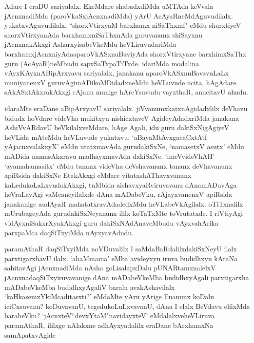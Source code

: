 \begin{artha}
Adare I eraDU sariyalalx. EkeMdare shabadxdiMda uMTAda keVvala jAcnxnadiMda (paroVkaSxjAcnxnadiMda) yArU AcAyaR\-\break neMdAguvudilalx. yukatxvAguvudilalx, ``shorxVtirxyaM barxhamx niSaThxmf" eMdu shurxtiyeV shorxVtirxyanAda barxhamxniSaThxnAda guruvanunx shiSayxnu jAcnxnakAkxgi AsharxyisabeVkeMdu heVLiruvudariMda barxhamxjAcnxniyAda\break aparoVkASxnuBaviyAda shorxVtirxyane barxhimxSaThx guru (AcAyaR)\break neMbudu sapxSaTxpaTiTxde. idariMda modalina vAyxKAyxnABipArxyavu sariyalalx, janakanu aparoVkASxnuBavavuLaLx muniyanenxV guruvAgimADikoMDidadxneMdu heVLuvude ucita, hAgAdare sAkASxtAkxrakAkxgi rAjanu munige hAreYsuvudu vayxthaR, anucitavU ahudu. 
\end{artha}
\newpage
\begin{artha}
idaraMte eraDane aBipArxyavU sariyalalx. jiVvanumxkatxnAgidadxlilx deVhavu bidudx hoVdare videVha mukitxyu nishicxtaveV AgideyAdadx\-riMda janakana AshiVvARdavU beVkilalxveMdare, hAge Agali, idu guru dakiSxNigAgiyeV heVLida mAteMdu heVLuvude yukatxvu, `aBayaMtAvxgacaCxtAtf yAjacnxvalakxyX' eMdu utatxmavAda gurudakiSxNe, `namasetxV asutx' eMdu mADida namasAkxravu madhayxmavAda dakiSxNe. `imeVvideVhAH' `ayamahamasitx' eMdu tananx videVha deVshavanunx tananx deVhavanunx apiRsida dakiSxNe EtakAkxgi eMdare vitatxshAThayxvanunx kaLedukoLaLxvudakAkxgi, tuMbida aishavxyaRviruvavanu dAnamADuvAga heVraLavAgi vaMcaneyilalxde dAna mADabeVku, rAjayxvanenxV apiRsida janakanige audAyaR mahatatxravAdadedxMdu heVLabeVkAgilalx. oTiTxnalilx mUrubageyAda gurudakiSxNeyanunx ililx koTaTxMte toVrutatxde. I riVtiyAgi vidAyxniSakxrXyakAkxgi guru dakiSxNAdAnaveMbudu vAyxvahArika parxpaMca daqSiTxyiMda nAyxyavAdudu. 
\end{artha}


\begin{artha}
paramAthaR daqSiTxyiMda noVDuvalilx I saMdaBaRdalilx\break dakiSxNeyU ilalx parxtigarxhavU ilalx. `ahaMmama' eMba avideyxyu iruva budidhxyu kAraNa sahitavAgi jAcnxnadiMda nAsha goLisalapxDalu pUNARtamxnalelxV jAcnxnadaqSiTxyiruvavanige dAna mADabeVkeMba budidhxyAgali parxtigarxha mADabeVkeMba budidhxyAgaliV baralu avakAshavilalx `kaHkasemxYkiMcaditasxti?' eMdaMte yAru yArige Enanunx koDalu iciCxsuvanu? koDuvavanU, tegedukoLuLxvavanU, dAna I elalx BeVdavu elilxMda barabeVku? `jAcnxteV``devxYtaM"navidayxteV' eMdalalxve\break heVLiruva paramAthaR, ililxge nAlakxne adhAyxyadalilx eraDane bArxhamxNa samApatxvAgide
\end{artha}

